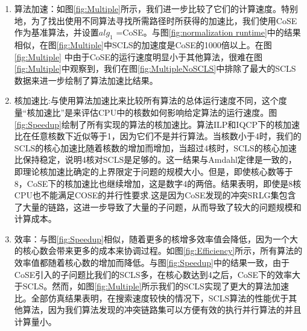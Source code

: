\begin{enumerate}
   \item   算法加速：如图\ref{fig:Multiple}所示，我们进一步比较了它们的计算速度。特别地，为了找出使用不同算法寻找所需路径时所获得的加速比，我们使用CoSE作为基准算法，并设置$alg_1$ =CoSE。与图\ref{fig:normalization runtime}中的结果相似，在图\ref{fig:Multiple}中SCLS的加速度是CoSE的1000倍以上。在图\ref{fig:Multiple} 中由于CoSE的运行速度明显小于其他算法，很难在图\ref{fig:Multiple}中观察到，我们在图\ref{fig:MultipleNoSCLS}中排除了最大的SCLS数据来进一步绘制了算法加速比结果。
   \item 核加速比:与使用算法加速比来比较所有算法的总体运行速度不同，这个度量“核加速比”是来评估CPU中的核数如何影响给定算法的运行速度。图\ref{fig:Speedup}绘制了所有实现的算法的核加速比。算法ILP和IQCP下的核加速比在任意核数下近似等于1，因为它们不是并行算法。当核数小于4时，我们的SCLS的核心加速比随着核数的增加而增加，当超过4核时，SCLS的核心加速比保持稳定，说明4核对SCLS是足够的。这一结果与Amdahl定律\cite{amdahl1967validity}是一致的，即理论核加速比确定的上界限定于问题的规模大小。但是，即使核心数等于8，CoSE下的核加速比也继续增加，这是数字4的两倍。结果表明，即使是8核CPU也不能满足COSE的并行性要求.这是因为CoSE发现的冲突SRLG集包含了大量的链路，这进一步导致了大量的子问题，从而导致了较大的问题规模和计算成本。
    \item 效率：与图\ref{fig:Speedup}相似，随着更多的核增多效率值会降低，因为一个大的核心数会带来更多的成本来协调过程。如图\ref{fig:Efficiency}所示，所有算法的效率值都随着核心数的增加而降低。与图\ref{fig:Speedup}中的结果一致，由于CoSE引入的子问题比我们的SCLS多，在核心数达到4之后，CoSE下的效率大于SCLS。然而，如图\ref{fig:Multiple}所示我们的SCLS实现了更大的算法加速比。全部仿真结果表明，在搜索速度较快的情况下，SCLS算法的性能优于其他算法，因为我们算法发现的冲突链路集可以方便有效的执行并行算法的并且计算量小。
\end{enumerate}


